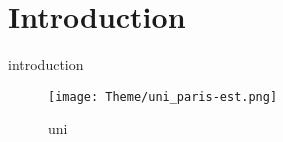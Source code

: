 
\chapter{Introduction}

introduction

\begin{figure}
    \texttt{[image: Theme/uni\_paris-est.png]}
    \caption{uni}
\end{figure}

\clearpage  %
